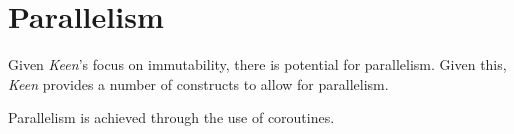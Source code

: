 \section{Parallelism}
\label{sec:parallelism}
  Given \textit{Keen}'s focus on immutability, there is potential for
  parallelism. Given this, \textit{Keen} provides a number of constructs
  to allow for parallelism. 

  Parallelism is achieved through the use of coroutines.
  